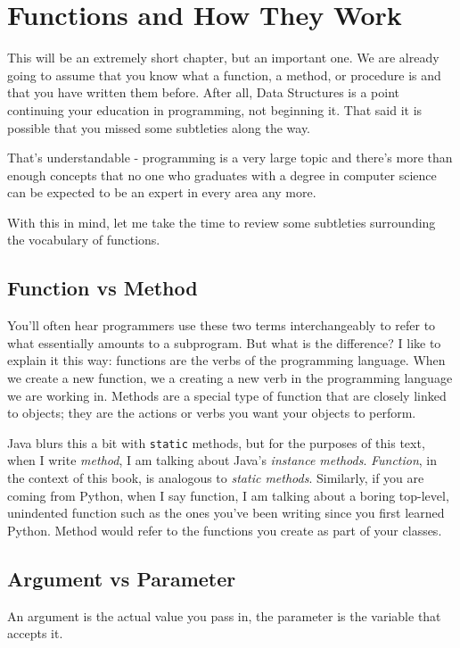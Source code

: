 \chapter{Functions and How They Work}

This will be an extremely short chapter, but an important one.
We are already going to assume that you know what a function, a method, or procedure is and that you have written them before.
After all, Data Structures is a point continuing your education in programming, not beginning it.
That said it is possible that you missed some subtleties along the way.

That's understandable -  programming is a very large topic and there's more than enough concepts that no one who graduates with a degree in computer science can be expected to be an expert in every area any more.

With this in mind, let me take the time to review some subtleties surrounding the vocabulary of functions.


\section{Function vs Method}

You'll often hear programmers use these two terms interchangeably to refer to what essentially amounts to a subprogram.
But what is the difference?  
I like to explain it this way:  functions are the verbs of the programming language.  When we create a new function, we a creating a new verb in the programming language we are working in.  
Methods are a special type of function that are closely linked to objects;  they are the actions or verbs you want your objects to perform.

Java blurs this a bit with \texttt{static} methods, but for the purposes of this text, when I write \textit{method}, I am talking about Java's \textit{instance methods}. \textit{Function}, in the context of this book, is analogous to \textit{static methods}. 
Similarly, if you are coming from Python, when I say function, I am talking about a boring top-level, unindented function such as the ones you've been writing since you first learned Python.  Method would refer to the functions you create as part of your classes.



\section{Argument vs Parameter}
An argument is the actual value you pass in, the parameter is the variable that accepts it.


